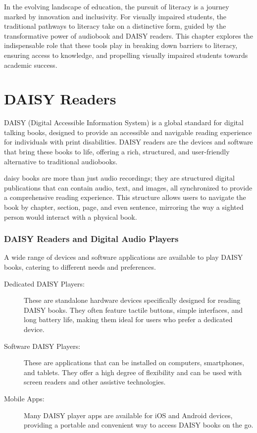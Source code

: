 In the evolving landscape of education, the pursuit of literacy is a journey marked by innovation and inclusivity. For visually impaired students, the traditional pathways to literacy take on a distinctive form, guided by the transformative power of audiobook and DAISY readers. This chapter explores the indispensable role that these tools play in breaking down barriers to literacy, ensuring access to knowledge, and propelling visually impaired students towards academic success.\supercite{Bookshare, BARDMobile, Audible}

\section{DAISY Readers}\label{ch7:sec:daisy-readers}

DAISY (Digital Accessible Information System) is a global standard for digital talking books, designed to provide an accessible and navigable reading experience for individuals with print disabilities. DAISY readers are the devices and software that bring these books to life, offering a rich, structured, and user-friendly alternative to traditional audiobooks.\supercite{DAISY2024, Wikipedia2024}

\gls{daisy} books are more than just \gls{audio} recordings; they are structured digital publications that can contain \gls{audio}, text, and images, all synchronized to provide a comprehensive reading experience. This structure allows users to navigate the book by chapter, section, page, and even sentence, mirroring the way a sighted person would interact with a physical book.\supercite{MDPI2022}

\subsubsection{DAISY Readers and Digital Audio Players}

A wide range of devices and \gls{software} applications are available to play DAISY books, catering to different needs and preferences.

\begin{description}
	\item[Dedicated DAISY Players:] These are standalone hardware devices specifically designed for reading DAISY books. They often feature tactile buttons, simple interfaces, and long battery life, making them ideal for users who prefer a dedicated device.
	\item[Software DAISY Players:] These are applications that can be installed on computers, smartphones, and tablets. They offer a high degree of flexibility and can be used with screen readers and other assistive technologies.
	\item[Mobile Apps:] Many DAISY player apps are available for iOS and Android devices, providing a portable and convenient way to access DAISY books on the go.
\end{description}

